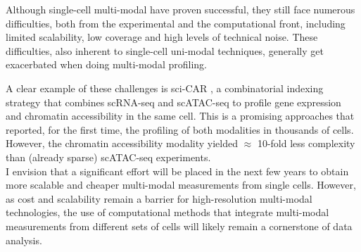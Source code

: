 
Although single-cell multi-modal have proven successful, they still face numerous difficulties, both from the experimental and the computational front, including limited scalability, low coverage and high levels of technical noise. These difficulties, also inherent to single-cell uni-modal techniques, generally get exacerbated when doing multi-modal profiling.

A clear example of these challenges is sci-CAR \cite{Cao2018a}, a combinatorial indexing strategy that combines scRNA-seq and scATAC-seq to profile gene expression and chromatin accessibility in the same cell. This is a promising approaches that reported, for the first time, the profiling of both modalities in thousands of cells. However, the  chromatin accessibility modality yielded $\approx$ 10-fold less complexity than (already sparse) scATAC-seq experiments.\\

I envision that a significant effort will be placed in the next few years to obtain more scalable and cheaper multi-modal measurements from single cells. However, as cost and scalability remain a barrier for high-resolution multi-modal technologies, the use of computational methods that integrate multi-modal measurements from different sets of cells will likely remain a cornerstone of data analysis.


